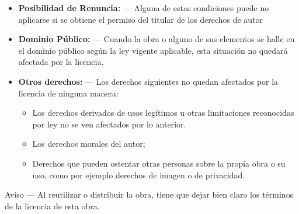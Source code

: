 \begin{itemize}
\itemsep1pt\parskip0pt
\item
{\bf Posibilidad de Renuncia:} —
Alguna de estas condiciones puede no aplicarse si se obtiene el permiso del titular de los derechos de autor
\item
{\bf Dominio Público:} —
Cuando la obra o alguno de sus elementos se halle en el dominio público según la ley vigente aplicable, esta situación no quedará afectada por la licencia.
\item
{\bf Otros derechos:} — 
Los derechos siguientes no quedan afectados por la licencia de ninguna manera:
\begin{itemize}
\item 
Los derechos derivados de usos legítimos u otras limitaciones reconocidas por ley no se ven afectados por lo anterior.
\item
Los derechos morales del autor;
\item
Derechos que pueden ostentar otras personas sobre la propia obra o su uso, como por ejemplo derechos de imagen o de privacidad.
\end{itemize}
\end{itemize}

Aviso — Al reutilizar o distribuir la obra, tiene que dejar bien claro los términos de la licencia de esta obra.


\newpage

\newpage

